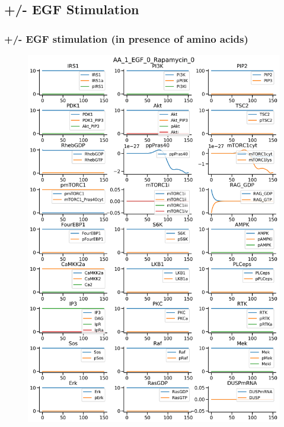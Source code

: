 \documentclass{beamer}
\begin{document}
\subsection{+/- EGF Stimulation} %
\begin{frame}
\frametitle{+/- EGF stimulation (in presence of amino acids)}
\begin{figure}
    \begin{minipage}{0.45\textwidth}
        \centering
        \includegraphics[width=\textwidth]{../simulations/ExtendedPI3KModel/validations/AAWithEGFWithRapamycin/AA_1_EGF_0_Rapamycin_0-4.png}
    \end{minipage}
    \begin{minipage}{0.45\textwidth}

\end{minipage}
\end{figure}
\end{frame}
\end{document}
